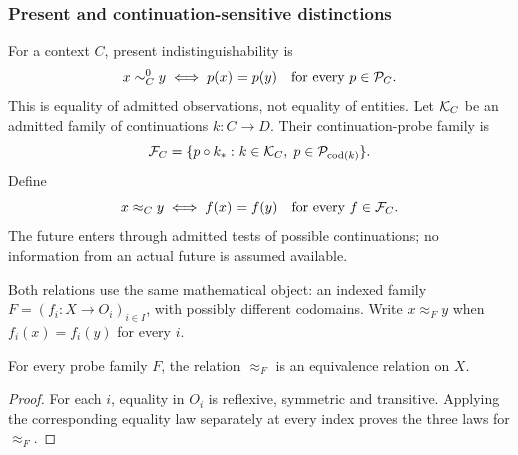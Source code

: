 \subsubsection{Present and continuation-sensitive distinctions}
\label{ss:continuations}

For a context $C$, present indistinguishability is
\begin{equation}
  x \sim^{0}_{C} y
  \iff p(x)=p(y)\quad\text{for every }p\in\mathcal{P}_{C}.
  \label{eq:present-eq}
\end{equation}
This is equality of admitted observations, not equality of entities.
Let $\mathcal{K}_{C}$ be an admitted family of continuations $k:C\to D$.
Their continuation-probe family is
\begin{equation}
  \mathcal{F}_{C}=\{p\circ k_*:k\in\mathcal{K}_{C},\;
    p\in\mathcal{P}_{\operatorname{cod}(k)}\}.
  \label{eq:cont-probe-family}
\end{equation}
Define
\begin{equation}
  x\approx_{C}y\iff f(x)=f(y)
    \quad\text{for every }f\in\mathcal{F}_{C}.
  \label{eq:cont-eq}
\end{equation}
The future enters through admitted tests of possible continuations;
no information from an actual future is assumed available.

Both relations use the same mathematical object: an indexed family
$F=(f_i:X\to O_i)_{i\in I}$, with possibly different codomains.
Write $x\approx_F y$ when $f_i(x)=f_i(y)$ for every $i$.

\begin{theorem}\label{thm:observational-equivalence}
For every probe family $F$, the relation $\approx_F$ is an equivalence
relation on $X$.
\end{theorem}
\begin{proof}
For each $i$, equality in $O_i$ is reflexive, symmetric and transitive.
Applying the corresponding equality law separately at every index proves
the three laws for $\approx_F$.
\end{proof}
